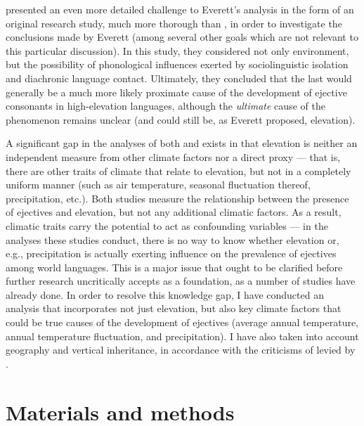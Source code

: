 \documentclass{article}
\begin{document}
\textcite{urban2021} presented an even more detailed challenge to Everett's analysis in the form of an original research study, much more thorough than \textcite{hammarstroem2013}, in order to investigate the conclusions made by Everett (among several other goals which are not relevant to this particular discussion). In this study, they considered not only environment, but the possibility of phonological influences exerted by sociolinguistic isolation and diachronic language contact. Ultimately, they concluded that the last would generally be a much more likely proximate cause of the development of ejective consonants in high-elevation languages, although the \emph{ultimate} cause of the phenomenon remains unclear (and could still be, as Everett proposed, elevation).

A significant gap in the analyses of both \textcite{everett2013} and \textcite{urban2021} exists in that elevation is neither an independent measure from other climate factors nor a direct proxy --- that is, there are other traits of climate that relate to elevation, but not in a completely uniform manner (such as air temperature, seasonal fluctuation thereof, precipitation, etc.). Both studies measure the relationship between the presence of ejectives and elevation, but not any additional climatic factors. As a result, climatic traits carry the potential to act as confounding variables --- in the analyses these studies conduct, there is no way to know whether elevation or, e.g., precipitation is actually exerting influence on the prevalence of ejectives among world languages. This is a major issue that ought to be clarified before further research uncritically accepts \textcite{everett2013} as a foundation, as a number of studies have already done. In order to resolve this knowledge gap, I have conducted an analysis that incorporates not just elevation, but also key climate factors that could be true causes of the development of ejectives (average annual temperature, annual temperature fluctuation, and precipitation). I have also taken into account geography and vertical inheritance, in accordance with the criticisms of \textcite{everett2013} levied by \textcite{hammarstroem2013}.

\section{Materials and methods}
\end{document}
